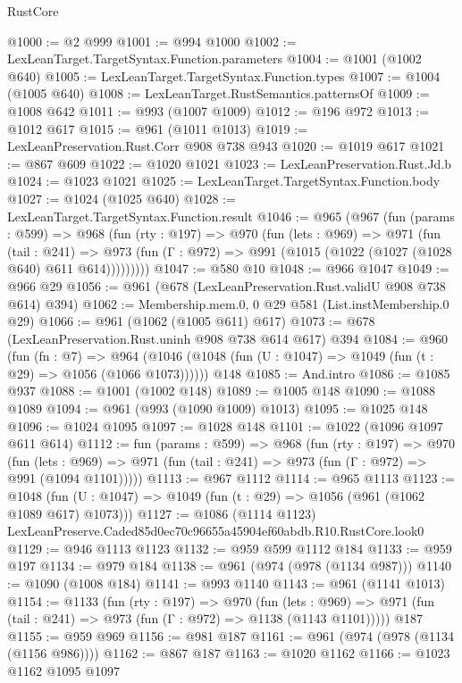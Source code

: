 \begin{lexlean}{RustCore}
\begin{coremodule}
@1000 := @2 @999
@1001 := @994 @1000
@1002 := LexLeanTarget.TargetSyntax.Function.parameters
@1004 := @1001 (@1002 @640)
@1005 := LexLeanTarget.TargetSyntax.Function.types
@1007 := @1004 (@1005 @640)
@1008 := LexLeanTarget.RustSemantics.patternsOf
@1009 := @1008 @642
@1011 := @993 (@1007 @1009)
@1012 := @196 @972
@1013 := @1012 @617
@1015 := @961 (@1011 @1013)
@1019 := LexLeanPreservation.Rust.Corr @908 @738 @943
@1020 := @1019 @617
@1021 := @867 @609
@1022 := @1020 @1021
@1023 := LexLeanPreservation.Rust.Jd.b
@1024 := @1023 @1021
@1025 := LexLeanTarget.TargetSyntax.Function.body
@1027 := @1024 (@1025 @640)
@1028 := LexLeanTarget.TargetSyntax.Function.result
@1046 := @965
    (@967
      (fun (params : @599) =>
      @968
        (fun (rty : @197) =>
        @970
          (fun (lets : @969) =>
          @971
            (fun (tail : @241) =>
            @973 (fun (Γ : @972) => @991 (@1015 (@1022 (@1027 (@1028 @640) @611 @614)))))))))
@1047 := @580 @10
@1048 := @966 @1047
@1049 := @966 @29
@1056 := @961 (@678 (LexLeanPreservation.Rust.validU @908 @738 @614) @394)
@1062 := Membership.mem.{0, 0} @29 @581 (List.instMembership.{0} @29)
@1066 := @961 (@1062 (@1005 @611) @617)
@1073 := @678 (LexLeanPreservation.Rust.uninh @908 @738 @614 @617) @394
@1084 := @960
    (fun (fn : @7) =>
    @964 (@1046 (@1048 (fun (U : @1047) => @1049 (fun (t : @29) => @1056 (@1066 @1073))))))
    @148
@1085 := And.intro
@1086 := @1085 @937
@1088 := @1001 (@1002 @148)
@1089 := @1005 @148
@1090 := @1088 @1089
@1094 := @961 (@993 (@1090 @1009) @1013)
@1095 := @1025 @148
@1096 := @1024 @1095
@1097 := @1028 @148
@1101 := @1022 (@1096 @1097 @611 @614)
@1112 := fun (params : @599) =>
  @968
    (fun (rty : @197) =>
    @970
      (fun (lets : @969) =>
      @971 (fun (tail : @241) => @973 (fun (Γ : @972) => @991 (@1094 @1101)))))
@1113 := @967 @1112
@1114 := @965 @1113
@1123 := @1048 (fun (U : @1047) => @1049 (fun (t : @29) => @1056 (@961 (@1062 @1089 @617) @1073)))
@1127 := @1086 (@1114 @1123) LexLeanPreserve.Caded85d0ec70c96655a45904ef60abdb.R10.RustCore.look0
@1129 := @946 @1113 @1123
@1132 := @959 @599 @1112 @184
@1133 := @959 @197
@1134 := @979 @184
@1138 := @961 (@974 (@978 (@1134 @987)))
@1140 := @1090 (@1008 @184)
@1141 := @993 @1140
@1143 := @961 (@1141 @1013)
@1154 := @1133
    (fun (rty : @197) =>
    @970
      (fun (lets : @969) =>
      @971 (fun (tail : @241) => @973 (fun (Γ : @972) => @1138 (@1143 @1101)))))
    @187
@1155 := @959 @969
@1156 := @981 @187
@1161 := @961 (@974 (@978 (@1134 (@1156 @986))))
@1162 := @867 @187
@1163 := @1020 @1162
@1166 := @1023 @1162 @1095 @1097

\end{coremodule}
\end{lexlean}
